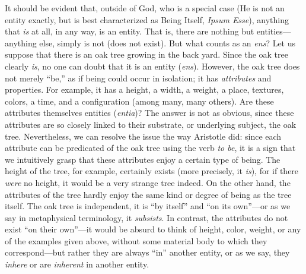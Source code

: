 \documentclass[
  12pt,
]{memoir}
\begin{document}
It should be evident that, outside of God, who is a special case (He is
not an entity exactly, but is best characterized as Being Itself,
\emph{Ipsum Esse}), anything that \emph{is} at all, in any way, is an
entity. That is, there are nothing but entities---anything else, simply
is not (does not exist). But what counts as an \emph{ens}? Let us
suppose that there is an oak tree growing in the back yard. Since the
oak tree clearly \emph{is}, no one can doubt that it is an entity
(\emph{ens}). However, the oak tree does not merely ``be,'' as if being
could occur in isolation; it has \emph{attributes} and properties. For
example, it has a height, a width, a weight, a place, textures, colors,
a time, and a configuration (among many, many others). Are these
attributes themselves entities (\emph{entia})? The answer is not as
obvious, since these attributes are so closely linked to their
substrate, or underlying subject, the oak tree. Nevertheless, we can
resolve the issue the way Aristotle did: since each attribute can be
predicated of the oak tree using the verb \emph{to be}, it is a sign
that we intuitively grasp that these attributes enjoy a certain type of
being. The height of the tree, for example, certainly exists (more
precisely, it \emph{is}), for if there \emph{were} no height, it would
be a very strange tree indeed. On the other hand, the attributes of the
tree hardly enjoy the same kind or degree of being as the tree itself.
The oak tree is independent, it is ``by itself'' and ``on its own''---or
as we say in metaphysical terminology, it \emph{subsists}. In contrast,
the attributes do not exist ``on their own''---it would be absurd to
think of height, color, weight, or any of the examples given above,
without some material body to which they correspond---but rather they
are always ``in'' another entity, or as we say, they \emph{inhere} or
are \emph{inherent} in another entity.
\end{document}
